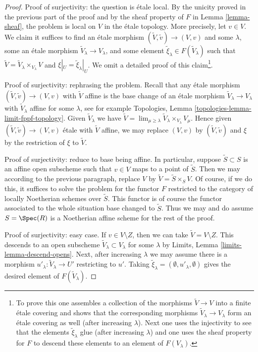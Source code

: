 \begin{proof}
\medskip\noindent
Proof of surjectivity: the question is \'etale local.
By the unicity proved in the previous part of the proof and by the
sheaf property of $F$ in Lemma \ref{lemma-sheaf}, the problem
is local on $V$ in the \'etale topology. More precisely, let $v \in V$.
We claim it suffices to find an \'etale morphism
$(\tilde V, \tilde v) \to (V, v)$ and some
$\lambda$, some an \'etale morphism $\tilde V_\lambda \to V_\lambda$,
and some element $\tilde \xi_\lambda \in F(\tilde V_\lambda)$ such that
$\tilde V = \tilde V_\lambda \times_{V_\lambda} V$
and $\xi|_U = \tilde \xi_\lambda|_U$. We omit a detailed proof of
this claim\footnote{To prove this
one assembles a collection of the morphisms $\tilde V \to V$
into a finite \'etale covering and shows that the corresponding morphisms
$\tilde V_\lambda \to V_\lambda$ form an \'etale covering as well (after
increasing $\lambda$). Next one uses the injectivity to see that
the elements $\tilde \xi_\lambda$ glue (after increasing $\lambda$)
and one uses the sheaf property for $F$ to descend these
elements to an element of $F(V_\lambda)$.}.

\medskip\noindent
Proof of surjectivity: rephrasing the problem.
Recall that any \'etale morphism $(\tilde V, \tilde v) \to (V, v)$
with $\tilde V$ affine is the base change of an \'etale morphism
$\tilde V_\lambda \to V_\lambda$ with $\tilde V_\lambda$ affine
for some $\lambda$, see for example
Topologies, Lemma \ref{topologies-lemma-limit-fppf-topology}.
Given $\tilde V_\lambda$ we have
$\tilde V = \lim_{\mu \geq \lambda} \tilde V_\lambda \times_{V_\lambda} V_\mu$.
Hence given $(\tilde V, \tilde v) \to (V, v)$ \'etale with $\tilde V$ affine,
we may replace $(V, v)$ by $(\tilde V, \tilde v)$ and $\xi$ by
the restriction of $\xi$ to $\tilde V$.

\medskip\noindent
Proof of surjectivity: reduce to base being affine. In particular,
suppose $\tilde S \subset S$ is an affine open subscheme such
that $v \in V$ maps to a point of $\tilde S$. Then we may according
to the previous paragraph, replace $V$ by $\tilde V = \tilde S \times_S V$.
Of course, if we do this, it suffices to solve the problem
for the functor $F$ restricted to the category of locally Noetherian
schemes over $\tilde S$. This functor is of course the functor
associated to the whole situation base changed to $\tilde S$.
Thus we may and do assume $S = \Spec(R)$ is a Noetherian affine scheme
for the rest of the proof.

\medskip\noindent
Proof of surjectivity: easy case.
If $v \in V \setminus Z$, then we can take $\tilde V = V \setminus Z$.
This descends to an open subscheme $\tilde V_\lambda \subset V_\lambda$
for some $\lambda$ by Limits, Lemma
\ref{limits-lemma-descend-opens}.
Next, after increasing $\lambda$ we may assume
there is a morphism $u'_\lambda : \tilde V_\lambda \to U'$
restricting to $u'$. Taking
$\tilde \xi_\lambda = (\emptyset, u'_\lambda, \emptyset)$
gives the desired element of $F(\tilde V_\lambda)$.


\end{proof}
